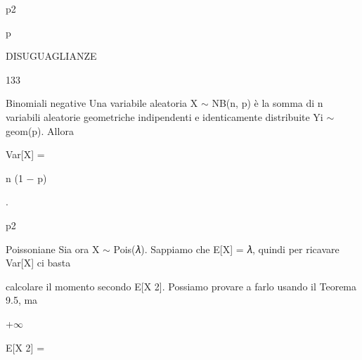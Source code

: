 \documentclass[a4paper,portrait,12pt]{article}
\begin{document}
\begin{flushleft}
p2
\end{flushleft}


\begin{flushleft}
p
\end{flushleft}





\begin{flushleft}
 DISUGUAGLIANZE
\end{flushleft}





133





\begin{flushleft}
Binomiali negative Una variabile aleatoria X $\sim$ NB(n, p) \`{e} la somma di n variabili aleatorie geometriche indipendenti e identicamente distribuite Yi $\sim$ geom(p). Allora
\end{flushleft}


\begin{flushleft}
Var[X] =
\end{flushleft}





\begin{flushleft}
n (1 $-$ p)
\end{flushleft}


.


\begin{flushleft}
p2
\end{flushleft}





\begin{flushleft}
Poissoniane Sia ora X $\sim$ Pois(𝜆). Sappiamo che E[X] = 𝜆, quindi per ricavare Var[X] ci basta
\end{flushleft}


\begin{flushleft}
calcolare il momento secondo E[X 2]. Possiamo provare a farlo usando il Teorema 9.5, ma
\end{flushleft}


+$\infty$





\begin{flushleft}
E[X 2] =
\end{flushleft}
\end{document}
